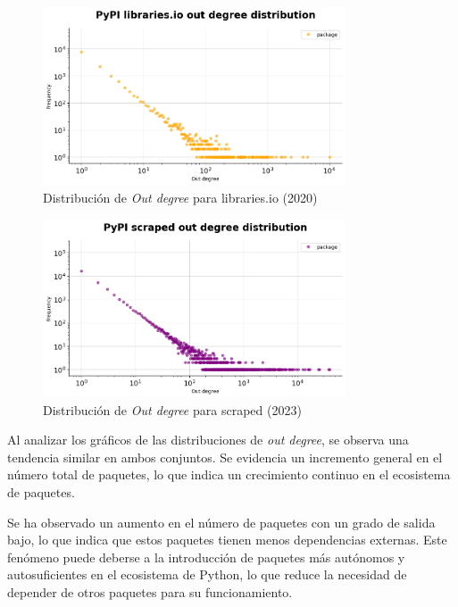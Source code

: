 \begin{figure}[h!]
    \begin{center}
        \includegraphics[width=0.8\textwidth]{img/pypi/outd_libio_dist.png}
        \caption{Distribución de \textit{Out degree} para libraries.io (2020)}
        \label{fig:pypi_libio_outd_dist}
    \end{center}
\end{figure}

\begin{figure}[h!]
    \begin{center}
        \includegraphics[width=0.8\textwidth]{img/pypi/outd_scraped_dist.png}
        \caption{Distribución de \textit{Out degree} para scraped (2023)}
        \label{fig:pypi_scraped_outd_dist}
    \end{center}
\end{figure}

Al analizar los gráficos de las distribuciones de \textit{out degree}, se observa una tendencia similar
en ambos conjuntos. Se evidencia un incremento general en el número total de paquetes, lo que indica un
crecimiento continuo en el ecosistema de paquetes.

Se ha observado un aumento en el número de paquetes con un grado de salida bajo, lo que indica que estos
paquetes tienen menos dependencias externas. Este fenómeno puede deberse a la introducción de paquetes
más autónomos y autosuficientes en el ecosistema de Python, lo que reduce la necesidad de depender de
otros paquetes para su funcionamiento.

